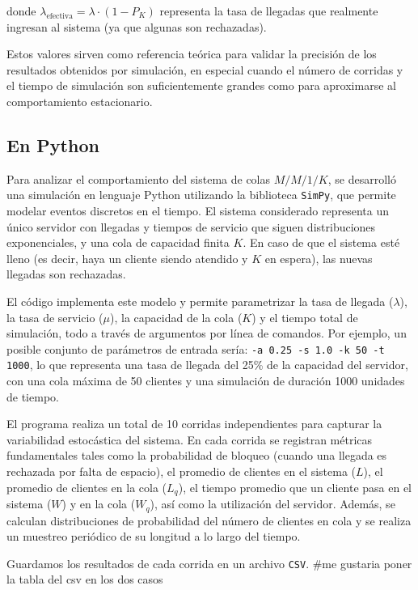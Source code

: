 \documentclass{article}
\begin{document}
donde \( \lambda_{\text{efectiva}} = \lambda \cdot (1 - P_K) \) representa la tasa de llegadas que realmente ingresan al sistema (ya que algunas son rechazadas).

Estos valores sirven como referencia teórica para validar la precisión de los resultados obtenidos por simulación, en especial cuando el número de corridas y el tiempo de simulación son suficientemente grandes como para aproximarse al comportamiento estacionario.


\subsection{En Python}
Para analizar el comportamiento del sistema de colas \( M/M/1/K \), se desarrolló una simulación en lenguaje Python utilizando la biblioteca \texttt{SimPy}, que permite modelar eventos discretos en el tiempo. El sistema considerado representa un único servidor con llegadas y tiempos de servicio que siguen distribuciones exponenciales, y una cola de capacidad finita \( K \). En caso de que el sistema esté lleno (es decir, haya un cliente siendo atendido y \( K \) en espera), las nuevas llegadas son rechazadas.

El código implementa este modelo y permite parametrizar la tasa de llegada (\( \lambda \)), la tasa de servicio (\( \mu \)), la capacidad de la cola (\( K \)) y el tiempo total de simulación, todo a través de argumentos por línea de comandos. Por ejemplo, un posible conjunto de parámetros de entrada sería: \texttt{-a 0.25 -s 1.0 -k 50 -t 1000}, lo que representa una tasa de llegada del 25\% de la capacidad del servidor, con una cola máxima de 50 clientes y una simulación de duración 1000 unidades de tiempo.

El programa realiza un total de 10 corridas independientes para capturar la variabilidad estocástica del sistema. En cada corrida se registran métricas fundamentales tales como la probabilidad de bloqueo (cuando una llegada es rechazada por falta de espacio), el promedio de clientes en el sistema (\( L \)), el promedio de clientes en la cola (\( L_q \)), el tiempo promedio que un cliente pasa en el sistema (\( W \)) y en la cola (\( W_q \)), así como la utilización del servidor. Además, se calculan distribuciones de probabilidad del número de clientes en cola y se realiza un muestreo periódico de su longitud a lo largo del tiempo.

Guardamos los resultados de cada corrida en un archivo \texttt{CSV}.
#me gustaria poner la tabla del csv en los dos casos
\end{document}
